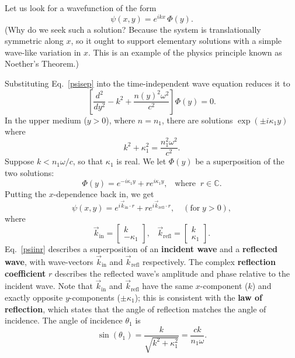 \documentclass[10pt,a4paper]{article}
\begin{document}
Let us look for a wavefunction of the form
\begin{equation}
  \psi(x,y) = e^{ikx} \, \Phi(y).
  \label{psisep}
\end{equation}
(Why do we seek such a solution?  Because the system is
translationally symmetric along $x$, so it ought to support elementary
solutions with a simple wave-like variation in $x$.  This is an
example of the physics principle known as Noether's Theorem.)

Substituting Eq.~\eqref{psisep} into the time-independent wave
equation reduces it to
\begin{equation}
  \left[\frac{d^2}{dy^2} - k^2 + \frac{n(y)^2 \omega^2}{c^2} \right]
  \Phi(y) = 0.
  \label{wave1dode}
\end{equation}
In the upper medium ($y > 0$), where $n = n_1$, there are solutions
$\exp(\pm i\kappa_1 y)$ where
\begin{equation}
  k^2 + \kappa_1^2 = \frac{n_1^2 \omega^2}{c^2}.
  \label{kk}
\end{equation}
Suppose $k < n_1 \omega / c$, so that $\kappa_1$ is real.  We let
$\Phi(y)$ be a superposition of the two solutions:
\begin{equation}
  \Phi(y) = e^{-i\kappa_1 y} + r e^{i\kappa_1 y}, \;\;\; \mathrm{where}\;\;
  r \in \mathbb{C}.
\end{equation}
Putting the $x$-dependence back in, we get
\begin{equation}
  \psi(x,y) = e^{i\vec{k}_{\mathrm{in}}\cdot r}
  + r e^{i\vec{k}_{\textrm{refl}}\cdot r}, \quad(\textrm{for} \; y > 0),
  \label{psiinr}
\end{equation}
where
\begin{equation}
  \vec{k}_{\textrm{in}} = \begin{bmatrix}k \\ -\kappa_1 \end{bmatrix}, \;\;\;
  \vec{k}_{\textrm{refl}} = \begin{bmatrix}k \\ \kappa_1 \end{bmatrix}.
\end{equation}
Eq.~\eqref{psiinr} describes a superposition of an \textbf{incident
  wave} and a \textbf{reflected wave}, with wave-vectors
$\vec{k}_{\textrm{in}}$ and $\vec{k}_{\textrm{refl}}$ respectively.
The complex \textbf{reflection coefficient} $r$ describes the
reflected wave's amplitude and phase relative to the incident wave.
Note that $\vec{k}_{\textrm{in}}$ and $\vec{k}_{\textrm{refl}}$ have
the same $x$-component ($k$) and exactly opposite $y$-components ($\pm
\kappa_1$); this is consistent with the \textbf{law of reflection},
which states that the angle of reflection matches the angle of
incidence.  The angle of incidence $\theta_1$ is
\begin{equation}
  \sin(\theta_1) = \frac{k}{\sqrt{k^2+\kappa_1^2}} = \frac{ck}{n_1\omega}.
  \label{sintheta1}
\end{equation}
\end{document}
